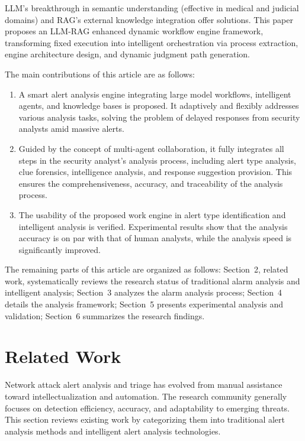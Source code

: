 \documentclass[sigconf,authordraft]{acmart}
\begin{document}
LLM's breakthrough in semantic understanding (effective in medical and judicial domains) and RAG's external knowledge integration offer solutions. This paper proposes an LLM-RAG enhanced dynamic workflow engine framework, transforming fixed execution into intelligent orchestration via process extraction, engine architecture design, and dynamic judgment path generation.

The main contributions of this article are as follows:

\begin{enumerate}
\item A smart alert analysis engine integrating large model workflows, intelligent agents, and knowledge bases is proposed. It adaptively and flexibly addresses various analysis tasks, solving the problem of delayed responses from security analysts amid massive alerts.
\item Guided by the concept of multi-agent collaboration, it fully integrates all steps in the security analyst's analysis process, including alert type analysis, clue forensics, intelligence analysis, and response suggestion provision. This ensures the comprehensiveness, accuracy, and traceability of the analysis process.
\item The usability of the proposed work engine in alert type identification and intelligent analysis is verified. Experimental results show that the analysis accuracy is on par with that of human analysts, while the analysis speed is significantly improved.
\end{enumerate}

The remaining parts of this article are organized as follows: Section~2, related work, systematically reviews the research status of traditional alarm analysis and intelligent analysis; Section~3 analyzes the alarm analysis process; Section~4 details the analysis framework; Section~5 presents experimental analysis and validation; Section~6 summarizes the research findings.

\section{Related Work}

Network attack alert analysis and triage has evolved from manual assistance toward intellectualization and automation. The research community generally focuses on detection efficiency, accuracy, and adaptability to emerging threats. This section reviews existing work by categorizing them into traditional alert analysis methods and intelligent alert analysis technologies.
\end{document}

